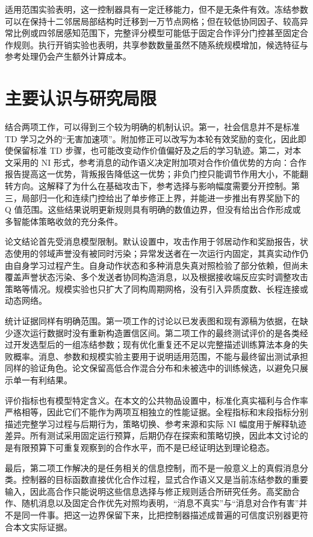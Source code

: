 适用范围实验表明，这一控制器具有一定迁移能力，但不是无条件有效。冻结参数可以在保持十二邻居局部结构时迁移到一万节点网格；但在较低协同因子、较高异常比例或四邻居感知范围下，完整评分模型可能低于固定合作评分门控甚至固定合作规则。执行开销实验也表明，共享参数数量虽然不随系统规模增加，候选特征与参考处理仍会产生额外计算成本。

\section{主要认识与研究局限}

结合两项工作，可以得到三个较为明确的机制认识。第一，社会信息并不是标准 TD 学习之外的“无害加速项”。附加修正可以改写为本轮有效奖励的变化，因此即使保留标准 TD 步骤，也可能改变动作价值偏好及之后的学习轨迹。第二，对本文采用的 NI 形式，参考消息的动作语义决定附加项对合作价值优势的方向：合作报告提高这一优势，背叛报告降低这一优势；非负门控只能调节作用大小，不能翻转方向。这解释了为什么在基础攻击下，参考选择与影响幅度需要分开控制。第三，局部归一化和连续门控给出了单步修正上界，并能进一步推出有界奖励下的 Q 值范围。这些结果说明更新规则具有明确的数值边界，但没有给出合作形成或多智能体策略收敛的充分条件。

论文结论首先受消息模型限制。默认设置中，攻击作用于邻居动作和奖励报告，状态使用的邻域声誉没有被同时污染；异常发送者在一次运行内固定，其真实动作仍由自身学习过程产生。自身动作状态和多种消息失真对照检验了部分依赖，但尚未覆盖声誉状态污染、多个发送者协同构造消息，以及根据接收端反应实时调整攻击策略等情况。规模实验也只扩大了同构周期网格，没有引入异质度数、长程连接或动态网络。

统计证据同样有明确范围。第一项工作的讨论以已发表图和现有源稿为依据，在缺少逐次运行数据时没有重新构造置信区间。第二项工作的最终测试评价的是各类经过开发选型后的一组冻结参数；现有优化重复还不足以完整描述训练算法本身的失败概率。消息、参数和规模实验主要用于说明适用范围，不能与最终留出测试承担同样的验证角色。论文保留高低合作混合分布和未被选中的训练候选，以避免只展示单一有利结果。

评价指标也有模型特定含义。在本文的公共物品设置中，标准化真实福利与合作率严格相等，因此它们不能作为两项互相独立的性能证据。全程指标和末段指标分别描述完整学习过程与后期行为，策略切换、参考来源和实际 NI 幅度用于解释轨迹差异。所有测试采用固定运行预算，后期仍存在探索和策略切换，因此本文讨论的是有限预算下可重复观察到的合作水平，而不是已经证明达到理论稳态。

最后，第二项工作解决的是任务相关的信息控制，而不是一般意义上的真假消息分类。控制器的目标函数直接优化合作过程，显式合作语义又是当前冻结参数的重要输入，因此高合作只能说明这些信息选择与修正规则适合所研究任务。高奖励合作、随机消息以及固定合作优先对照均表明，“消息不真实”与“消息对合作有害”并不是同一件事。把这一边界保留下来，比把控制器描述成普遍的可信度识别器更符合本文实际证据。

